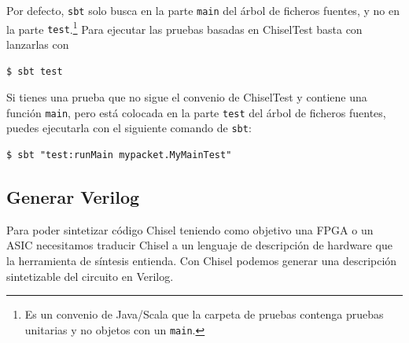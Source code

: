 \documentclass[%
    10pt,
    headinclude, footinclude=false,
    openright, %
    notitlepage,
    cleardoublepage=empty,
    headsepline,
    numbers=noenddot,
    bibliography=totoc, index=totoc,
    ]{scrbook}
\newcommand{\code}[1]{{\lstinline[basicstyle=\small\ttfamily]{#1}}}
\newcommand{\codefoot}[1]{{\lstinline[basicstyle=\footnotesize\ttfamily]{#1}}}
\begin{document}
Por defecto, \code{sbt} solo busca en la parte \code{main} del árbol de ficheros fuentes, y no en la
parte \code{test}.\footnote{Es un convenio de Java/Scala que la carpeta de pruebas contenga
pruebas unitarias y no objetos con un \codefoot{main}.}
Para ejecutar las pruebas basadas en ChiselTest basta con lanzarlas con

\begin{verbatim}
$ sbt test
\end{verbatim}


Si tienes una prueba que no sigue el convenio de ChiselTest y contiene una función \code{main},
pero está colocada en la parte \code{test} del árbol de ficheros fuentes, puedes ejecutarla
con el siguiente comando de \code{sbt}:

\begin{verbatim}
$ sbt "test:runMain mypacket.MyMainTest"
\end{verbatim}

\subsection{Generar Verilog}



Para poder sintetizar código Chisel teniendo como objetivo una FPGA o un ASIC necesitamos traducir Chisel a
un lenguaje de descripción de hardware que la herramienta de síntesis entienda.
Con Chisel podemos generar una descripción sintetizable del circuito en Verilog.

\end{document}

